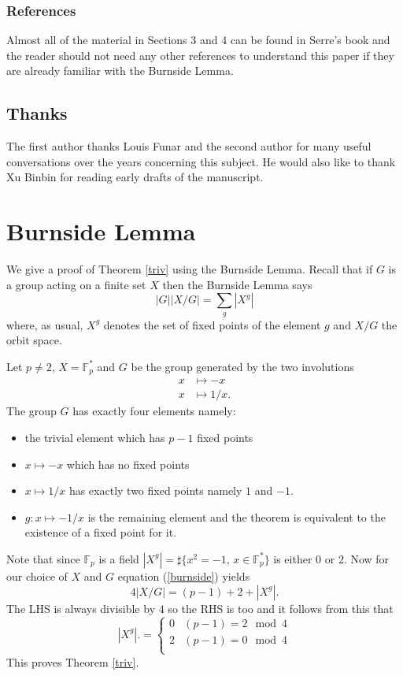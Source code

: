 \documentclass[12pt,a4paper]{amsart}
\def\fp{\mathbb{F}_p}
\begin{document}
 
 \subsubsection{References}
Almost all  of the material in Sections 3 and 4 
can be found in Serre's book \cite{serre} and the reader
should not need any other references to understand 
this paper if they are already familiar with  the Burnside Lemma.
 

\subsection{Thanks}

The first author thanks Louis Funar and the second author for  many useful conversations over the years concerning this subject. He would also like to thank Xu Binbin for reading early drafts of the manuscript.


\section{Burnside Lemma}

We give a proof of Theorem \ref{triv} using the Burnside Lemma.
Recall that if $G$ is  a group acting on a finite set $X$ then the Burnside Lemma says
\begin{equation}\label{burnside}
|G| |X/G| = \sum_{g} |X^g| 
\end{equation}  
where, as usual, 
 $X^g$ denotes the set of fixed points of the element $g$ 
 and $X/G$  the orbit space.


Let $p\neq 2$,  $X = \fp^*$ and $G$ be the group generated by the two involutions
\begin{eqnarray*}
x & \mapsto -x \\
x & \mapsto 1/x.
\end{eqnarray*}
The group  $G$ has exactly four elements namely:
\begin{itemize}
\item the trivial element which has  $p-1$ fixed points
\item $x\mapsto -x$ which has no fixed points 
\item  $x\mapsto 1/x$ has exactly two fixed points namely $1$ and $-1$.
\item  $g:x \mapsto -1/x$ is the remaining element and the theorem is equivalent to the existence of a fixed point for it.
\end{itemize}
Note that since $\fp$ is a field 
$|X^g| = \sharp \{x^2 = -1, \, x\in \fp^* \}$
is either $0$ or $2$.
Now for our choice of $X$ and $G$ equation (\ref{burnside}) yields
\begin{equation}
4 |X/G|   = (p-1) + 2 + |X^g|.
\end{equation}  
The LHS is always divisible by $4$ so the  RHS is too and
it follows from this that
$$ |X^g|. = \left\{  \begin{array}{ll}
0 & (p-1) =  2 \mod 4 \\
2 & (p-1) =  0 \mod 4 \\
\end{array}
\right.
$$
This proves Theorem \ref{triv}.
\end{document}
